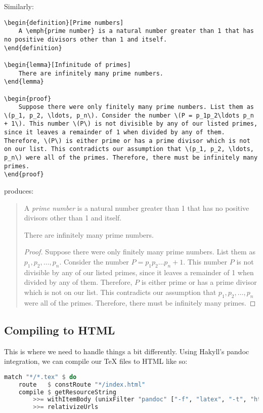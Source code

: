 Similarly:
\begin{verbatim}
\begin{definition}[Prime numbers]
    A \emph{prime number} is a natural number greater than 1 that has no positive divisors other than 1 and itself.
\end{definition}

\begin{lemma}[Infinitude of primes]
    There are infinitely many prime numbers.
\end{lemma}

\begin{proof}
    Suppose there were only finitely many prime numbers. List them as \(p_1, p_2, \ldots, p_n\). Consider the number \(P = p_1p_2\ldots p_n + 1\). This number \(P\) is not divisible by any of our listed primes, since it leaves a remainder of 1 when divided by any of them. Therefore, \(P\) is either prime or has a prime divisor which is not on our list. This contradicts our assumption that \(p_1, p_2, \ldots, p_n\) were all of the primes. Therefore, there must be infinitely many primes.
\end{proof}
\end{verbatim}
produces:
\begin{quote}
\begin{definition}
    A \emph{prime number} is a natural number greater than 1 that has no positive divisors other than 1 and itself.
\end{definition}

\begin{lemma}
    There are infinitely many prime numbers.
\end{lemma}

\begin{proof}
    Suppose there were only finitely many prime numbers. List them as \(p_1, p_2, \ldots, p_n\). Consider the number \(P = p_1p_2\ldots p_n + 1\). This number \(P\) is not divisible by any of our listed primes, since it leaves a remainder of 1 when divided by any of them. Therefore, \(P\) is either prime or has a prime divisor which is not on our list. This contradicts our assumption that \(p_1, p_2, \ldots, p_n\) were all of the primes. Therefore, there must be infinitely many primes.
\end{proof}
\end{quote}

\subsection{Compiling to HTML}
This is where we need to handle things a bit differently.
Using Hakyll's pandoc integration, we can compile our TeX files to HTML like so:
\begin{lstlisting}[language=haskell]
match "*/*.tex" $ do
    route   $ constRoute "*/index.html"
    compile $ getResourceString
        >>= withItemBody (unixFilter "pandoc" ["-f", "latex", "-t", "html5","--mathjax"])
        >>= relativizeUrls
\end{lstlisting}